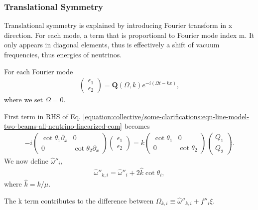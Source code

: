 \documentclass[letterpaper,12pt,english]{sphinxmanual}
\begin{document}
\subsubsection{Translational Symmetry}
\label{\detokenize{collective/some-clarifications:translational-symmetry}}
Translational symmetry is explained by introducing Fourier transform in x direction. For each mode, a term that is proportional to Fourier mode index m. It only appears in diagonal elements, thus is effectively a shift of vacuum frequencies, thus energies of neutrinos.

For each Fourier mode
\begin{equation*}
\begin{split}\begin{pmatrix}
\epsilon_1 \\
\epsilon_2
\end{pmatrix} =  \mathbf Q(\Omega,k) e^{-i(\Omega t- k x)},\end{split}
\end{equation*}
where we set \(\Omega=0\).

First term in RHS of Eq. \eqref{equation:collective/some-clarifications:eqn-line-model-two-beams-all-neutrino-linearized-eom} becomes
\begin{equation*}
\begin{split}- i \begin{pmatrix}\cot\theta_1\partial_x & 0 \\
0 & \cot\theta_2 \partial_x
\end{pmatrix} \begin{pmatrix}
\epsilon_1 \\
\epsilon_2
\end{pmatrix} = k \begin{pmatrix}\cot\theta_1 & 0 \\
0 & \cot\theta_2
\end{pmatrix} \begin{pmatrix}
Q_1 \\
Q_2
\end{pmatrix}.\end{split}
\end{equation*}
We now define \(\hat\omega''_i\),
\begin{equation*}
\begin{split}\hat\omega''_{k,i} = \hat \omega''_i + 2\hat k\cot\theta_i,\end{split}
\end{equation*}
where \(\hat k=k/\mu\).

The k term contributes to the difference between \(\Omega_{k,i}\equiv \hat\omega''_{k,i}+ f''_i\xi\).
\end{document}
